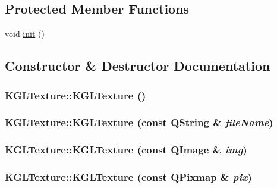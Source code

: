 \subsection*{Protected Member Functions}
\begin{CompactItemize}
\item 
void \hyperlink{class_k_g_l_texture_8ce2976f7a178e059436696412b58d24}{init} ()
\end{CompactItemize}


\subsection{Constructor \& Destructor Documentation}
\hypertarget{class_k_g_l_texture_36b9b3b9bdaeb08e62886b2bf573a41d}{
\subsubsection[{KGLTexture}]{\setlength{\rightskip}{0pt plus 5cm}KGLTexture::KGLTexture ()}}
\label{class_k_g_l_texture_36b9b3b9bdaeb08e62886b2bf573a41d}


\hypertarget{class_k_g_l_texture_c03f57e6b9a2eeefe61011150a4d86ae}{
\subsubsection[{KGLTexture}]{\setlength{\rightskip}{0pt plus 5cm}KGLTexture::KGLTexture (const QString \& {\em fileName})}}
\label{class_k_g_l_texture_c03f57e6b9a2eeefe61011150a4d86ae}


\hypertarget{class_k_g_l_texture_48c33d3bc28adcc229c8fee5b96c887d}{
\subsubsection[{KGLTexture}]{\setlength{\rightskip}{0pt plus 5cm}KGLTexture::KGLTexture (const QImage \& {\em img})}}
\label{class_k_g_l_texture_48c33d3bc28adcc229c8fee5b96c887d}


\hypertarget{class_k_g_l_texture_14a6af5eb6b31f6ce1fad224fdfe828f}{
\subsubsection[{KGLTexture}]{\setlength{\rightskip}{0pt plus 5cm}KGLTexture::KGLTexture (const QPixmap \& {\em pix})}}
\label{class_k_g_l_texture_14a6af5eb6b31f6ce1fad224fdfe828f}


